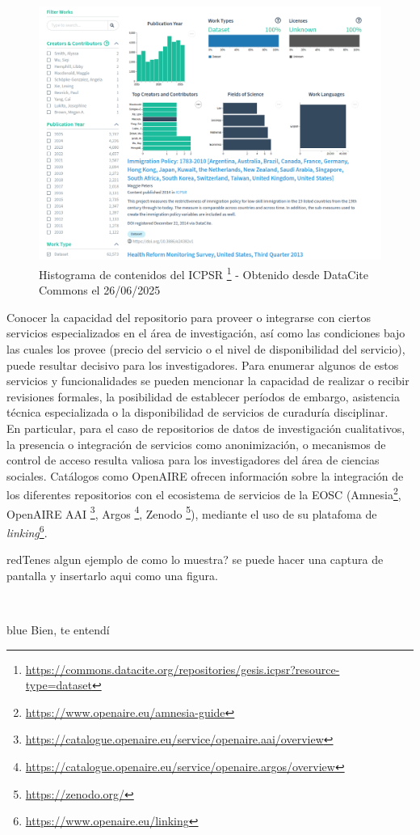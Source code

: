 \documentclass[runningheads]{llncs}
\def \bchregi {\begin{color}{red}}
\def \echregi {\end{color}}
\def \bchgon {\begin{color}{blue}}
\def \echgon {\end{color}}
\begin{document}
\begin{figure}
    \centering
    \includegraphics[width=0.5\linewidth]{img/datacite_commons_histograma.png}
    \caption{Histograma de contenidos del ICPSR 
    \footnote{\url{https://commons.datacite.org/repositories/gesis.icpsr?resource-type=dataset}}
    - Obtenido desde DataCite Commons el 26/06/2025}
    \label{fig:datacite_commons_histograma}
\end{figure}

Conocer la capacidad del repositorio para proveer o integrarse con ciertos servicios especializados en el área de investigación, así como las condiciones bajo las cuales los provee (precio del servicio o el nivel de disponibilidad del servicio), puede resultar decisivo para los investigadores.  
Para enumerar algunos de estos servicios y funcionalidades se pueden mencionar la capacidad de realizar o recibir revisiones formales, la posibilidad de establecer períodos de embargo, asistencia técnica especializada o la disponibilidad de servicios de curaduría disciplinar.\\
En particular, para el caso de repositorios de datos de investigación cualitativos, la presencia o integración de servicios como anonimización, o mecanismos de control de acceso resulta valiosa para los investigadores del área de ciencias sociales. 
Catálogos como OpenAIRE ofrecen información sobre la integración de los diferentes repositorios con el ecosistema de servicios de la EOSC (Amnesia\footnote{\url{https://www.openaire.eu/amnesia-guide}}, OpenAIRE AAI \footnote{\url{https://catalogue.openaire.eu/service/openaire.aai/overview}}, Argos \footnote{\url{https://catalogue.openaire.eu/service/openaire.argos/overview}}, Zenodo \footnote{\url{https://zenodo.org/}}), mediante el uso de su platafoma de \textit{linking}\footnote{\url{https://www.openaire.eu/linking}}.\\
\bchregi Tenes algun ejemplo de como lo muestra? se puede hacer una captura de pantalla y insertarlo aqui como una figura.
\echregi \\
\bchgon
Bien, te entendí
\echgon
\end{document}
